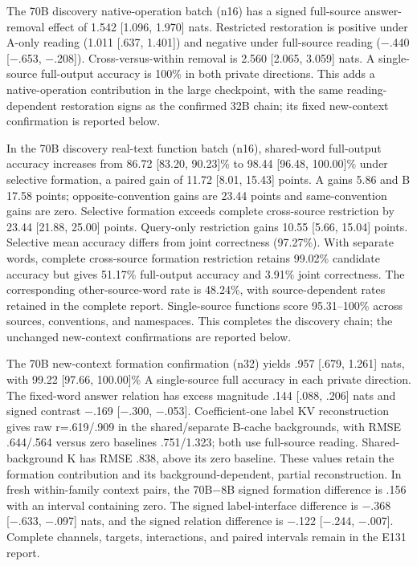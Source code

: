 \documentclass[11pt]{article}
\begin{document}
The 70B discovery native-operation batch (n16) has a signed full-source answer-removal effect of 1.542 {[}1.096, 1.970{]} nats. Restricted restoration is positive under A-only reading (1.011 {[}.637, 1.401{]}) and negative under full-source reading (−.440 {[}−.653, −.208{]}). Cross-versus-within removal is 2.560 {[}2.065, 3.059{]} nats. A single-source full-output accuracy is 100\% in both private directions. This adds a native-operation contribution in the large checkpoint, with the same reading-dependent restoration signs as the confirmed 32B chain; its fixed new-context confirmation is reported below.

In the 70B discovery real-text function batch (n16), shared-word full-output accuracy increases from 86.72 {[}83.20, 90.23{]}\% to 98.44 {[}96.48, 100.00{]}\% under selective formation, a paired gain of 11.72 {[}8.01, 15.43{]} points. A gains 5.86 and B 17.58 points; opposite-convention gains are 23.44 points and same-convention gains are zero. Selective formation exceeds complete cross-source restriction by 23.44 {[}21.88, 25.00{]} points. Query-only restriction gains 10.55 {[}5.66, 15.04{]} points. Selective mean accuracy differs from joint correctness (97.27\%). With separate words, complete cross-source formation restriction retains 99.02\% candidate accuracy but gives 51.17\% full-output accuracy and 3.91\% joint correctness. The corresponding other-source-word rate is 48.24\%, with source-dependent rates retained in the complete report. Single-source functions score 95.31--100\% across sources, conventions, and namespaces. This completes the discovery chain; the unchanged new-context confirmations are reported below.

The 70B new-context formation confirmation (n32) yields .957 {[}.679, 1.261{]} nats, with 99.22 {[}97.66, 100.00{]}\% A single-source full accuracy in each private direction. The fixed-word answer relation has excess magnitude .144 {[}.088, .206{]} nats and signed contrast −.169 {[}−.300, −.053{]}. Coefficient-one label KV reconstruction gives raw r=.619/.909 in the shared/separate B-cache backgrounds, with RMSE .644/.564 versus zero baselines .751/1.323; both use full-source reading. Shared-background K has RMSE .838, above its zero baseline. These values retain the formation contribution and its background-dependent, partial reconstruction. In fresh within-family context pairs, the 70B−8B signed formation difference is .156 with an interval containing zero. The signed label-interface difference is −.368 {[}−.633, −.097{]} nats, and the signed relation difference is −.122 {[}−.244, −.007{]}. Complete channels, targets, interactions, and paired intervals remain in the E131 report.
\end{document}

